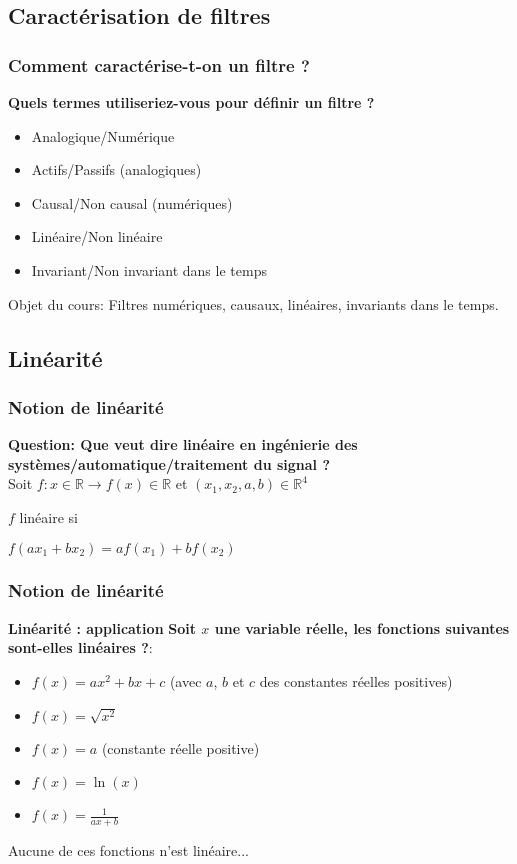\documentclass{beamer}
\begin{document}
\subsection{Caractérisation de filtres}
\begin{frame}
\frametitle{Comment caractérise-t-on un filtre ?}
\textbf{Quels termes utiliseriez-vous pour définir un filtre ?}
\vspace{1cm}
\begin{itemize}
\item<2-> Analogique/Numérique
\item<3-> Actifs/Passifs (analogiques)
\item<4-> Causal/Non causal (numériques)
\item<5-> Linéaire/Non linéaire 
\item<6-> Invariant/Non invariant dans le temps
\end{itemize}
{
\begin{block}{}
Objet du cours: Filtres numériques, causaux, linéaires, invariants dans le temps.
\end{block}
}
\end{frame}



\subsection{Linéarité}
\begin{frame}
\frametitle{Notion de linéarité}
\textbf{Question: Que veut dire linéaire en ingénierie des systèmes/automatique/traitement du signal ? \label{linéaire ?} }\\
\vspace{1 cm}
{
Soit $f : x \in \mathbb{R} \rightarrow f(x) \in \mathbb{R} $ et $(x_1,x_2,a,b) \in \mathbb{R}^4$
\\}
\vspace{1 cm}
{
$f$ linéaire si\\
\vspace{0.5 cm}
\begin{block}{}
$f(a x_1 + b x_2) = a f(x_1) + b f(x_2)$ 
\end{block}
}

\end{frame}

\begin{frame}
\frametitle{Notion de linéarité}
 \textbf{Linéarité : application}
\textbf{Soit $x$ une variable réelle, les fonctions suivantes sont-elles linéaires ?}:
 \vspace{0.5cm}
\begin{itemize}
\item<2-> $f(x) = a x^2 + b x + c$ (avec $a$, $b$ et $c$ des constantes réelles positives)
\item<3-> $f(x) = \sqrt{x^2}$
\item<4-> $f(x) = a$ (constante réelle positive)
\item<5-> $f(x) = \ln(x)$
\item<6-> $f(x) = \frac{1}{a x + b}$
\end{itemize}
\vspace{1cm}
{
Aucune de ces fonctions n'est linéaire...
}
\end{frame}
\end{document}
